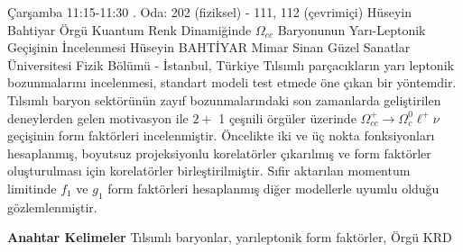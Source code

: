 
    \begin{abstract_basarim}
    {Çarşamba 11:15-11:30}
    {.}
    {Oda: 202 (fiziksel) - 111, 112 (çevrimiçi)}
    {Hüseyin Bahtiyar}
    {Örgü Kuantum Renk Dinamiğinde $\Omega_{c c}$ Baryonunun Yarı-Leptonik Geçişinin İncelenmesi}
    {%
    Hüseyin BAHTİYAR}
    {%
    }
    {%
    Mimar Sinan Güzel Sanatlar Üniversitesi Fizik Bölümü - İstanbul, Türkiye}
    Tılsımlı parçacıkların yarı leptonik bozunmalarını incelenmesi, standart modeli test etmede öne çıkan bir yöntemdir. Tılsımlı baryon sektörünün zayıf bozunmalarındaki son zamanlarda geliştirilen deneylerden gelen motivasyon ile $2+$ 1 çeşnili örgüler üzerinde $\Omega_{c c}^{+} \rightarrow \Omega_{c}^{0} \ell^{+} \nu$ geçişinin form faktörleri incelenmiştir. Öncelikte iki ve üç nokta fonksiyonları hesaplanmış, boyutsuz projeksiyonlu korelatörler çıkarılmış ve form faktörler oluşturulması için korelatörler birleştirilmiştir. Sıfir aktarılan momentum limitinde $f_{1}$ ve $g_{1}$ form faktörleri hesaplanmış diğer modellerle uyumlu olduğu gözlemlenmiştir. 
    
            \textbf{Anahtar Kelimeler} \newline{}Tılsımlı baryonlar, yarıleptonik form faktörler, Örgü KRD
    \end{abstract_basarim}
    